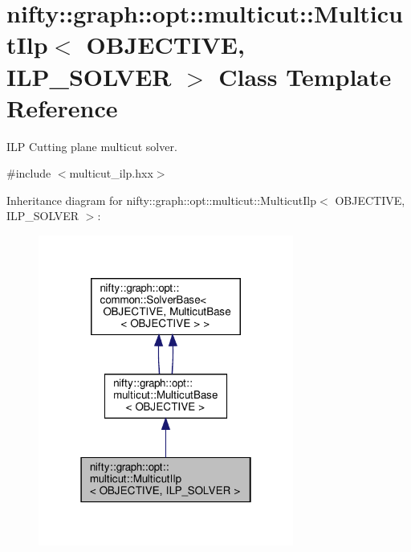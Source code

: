 \hypertarget{classnifty_1_1graph_1_1opt_1_1multicut_1_1MulticutIlp}{}\section{nifty\+:\+:graph\+:\+:opt\+:\+:multicut\+:\+:Multicut\+Ilp$<$ O\+B\+J\+E\+C\+T\+I\+VE, I\+L\+P\+\_\+\+S\+O\+L\+V\+ER $>$ Class Template Reference}
\label{classnifty_1_1graph_1_1opt_1_1multicut_1_1MulticutIlp}


I\+LP Cutting plane multicut solver.  




{\ttfamily \#include $<$multicut\+\_\+ilp.\+hxx$>$}



Inheritance diagram for nifty\+:\+:graph\+:\+:opt\+:\+:multicut\+:\+:Multicut\+Ilp$<$ O\+B\+J\+E\+C\+T\+I\+VE, I\+L\+P\+\_\+\+S\+O\+L\+V\+ER $>$\+:
\nopagebreak
\begin{figure}[H]
\begin{center}
\leavevmode
\includegraphics[width=238pt]{classnifty_1_1graph_1_1opt_1_1multicut_1_1MulticutIlp__inherit__graph}
\end{center}
\end{figure}


